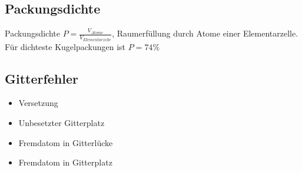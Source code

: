 \subsection{Packungsdichte}
Packungsdichte $P = \frac{V_{Atome}}{V_{Elementarzelle}}$, Raumerfüllung durch Atome einer Elementarzelle. Für dichteste Kugelpackungen ist $P=74\%$

\subsection{Gitterfehler}
\begin{itemize}
	\item Versetzung
	\item Unbesetzter Gitterplatz
	\item Fremdatom in Gitterlücke
	\item Fremdatom in Gitterplatz
\end{itemize}